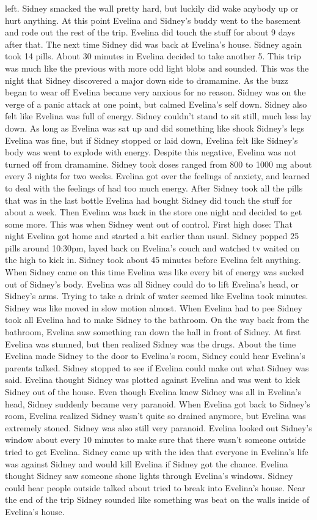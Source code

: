 \documentclass[12pt]{book}
\begin{document}
left. Sidney smacked the wall pretty hard, but luckily did wake anybody up or hurt anything. At this point Evelina and Sidney's buddy went to the basement and rode out the rest of the trip. Evelina did touch the stuff for about 9 days after that. The next time Sidney did was back at Evelina's house. Sidney again took 14 pills. About 30 minutes in Evelina decided to take another 5. This trip was much like the previous with more odd light blobs and sounded. This was the night that Sidney discovered a major down side to dramamine. As the buzz began to wear off Evelina became very anxious for no reason. Sidney was on the verge of a panic attack at one point, but calmed Evelina's self down. Sidney also felt like Evelina was full of energy. Sidney couldn't stand to sit still, much less lay down. As long as Evelina was sat up and did something like shook Sidney's legs Evelina was fine, but if Sidney stopped or laid down, Evelina felt like Sidney's body was went to explode with energy. Despite this negative, Evelina was not turned off from dramamine. Sidney took doses ranged from 800 to 1000 mg about every 3 nights for two weeks. Evelina got over the feelings of anxiety, and learned to deal with the feelings of had too much energy. After Sidney took all the pills that was in the last bottle Evelina had bought Sidney did touch the stuff for about a week. Then Evelina was back in the store one night and decided to get some more. This was when Sidney went out of control. First high dose: That night Evelina got home and started a bit earlier than usual. Sidney popped 25 pills around 10:30pm, layed back on Evelina's couch and watched tv waited on the high to kick in. Sidney took about 45 minutes before Evelina felt anything. When Sidney came on this time Evelina was like every bit of energy was sucked out of Sidney's body. Evelina was all Sidney could do to lift Evelina's head, or Sidney's arms. Trying to take a drink of water seemed like Evelina took minutes. Sidney was like moved in slow motion almost. When Evelina had to pee Sidney took all Evelina had to make Sidney to the bathroom. On the way back from the bathroom, Evelina saw something ran down the hall in front of Sidney. At first Evelina was stunned, but then realized Sidney was the drugs. About the time Evelina made Sidney to the door to Evelina's room, Sidney could hear Evelina's parents talked. Sidney stopped to see if Evelina could make out what Sidney was said. Evelina thought Sidney was plotted against Evelina and was went to kick Sidney out of the house. Even though Evelina knew Sidney was all in Evelina's head, Sidney suddenly became very paranoid. When Evelina got back to Sidney's room, Evelina realized Sidney wasn't quite so drained anymore, but Evelina was extremely stoned. Sidney was also still very paranoid. Evelina looked out Sidney's window about every 10 minutes to make sure that there wasn't someone outside tried to get Evelina. Sidney came up with the idea that everyone in Evelina's life was against Sidney and would kill Evelina if Sidney got the chance. Evelina thought Sidney saw someone shone lights through Evelina's windows. Sidney could hear people outside talked about tried to break into Evelina's house. Near the end of the trip Sidney sounded like something was beat on the walls inside of Evelina's house. 
\end{document}
